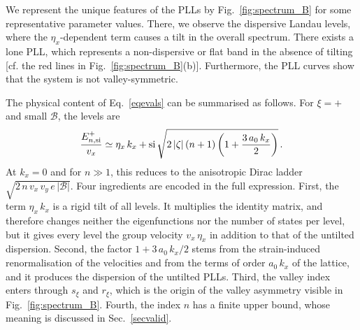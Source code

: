 \documentclass[aps,prb, onecolumn, nofootinbib, citeautoscript,10pt]{revtex4-2}
\begin{document}
We represent the unique features of the PLLs by Fig.~\ref{fig:spectrum_B} for some representative parameter values. There, we observe the dispersive Landau levels, where the $\eta_x$-dependent term causes a tilt in the overall spectrum. There exists a lone PLL, which represents a non-dispersive or flat band in the absence of tilting [cf. the red lines in Fig.~\ref{fig:spectrum_B}(b)]. Furthermore, the PLL curves show that the system is not valley-symmetric.


The physical content of Eq.~\eqref{eqevals} can be summarised as follows. For $\xi=+$ and small $\mathcal B$, the levels are
\begin{align}
\frac{E^{+}_{n,\rm si}}{v_x}\simeq\eta_x\,k_x+{\rm si}\,\sqrt{2\,|\zeta|\,(n+1)\left(1+\frac{3\,a_0\,k_x}{2}\right)}\,.
\end{align}
At $k_x=0$ and for $n\gg1$, this reduces to the anisotropic Dirac ladder $\sqrt{2\,n\,v_x\,v_y\,e\,|\mathcal B|}$. Four ingredients are encoded in the full expression. First, the term $\eta_x\,k_x$ is a rigid tilt of all levels. It multiplies the identity matrix, and therefore changes neither the eigenfunctions nor the number of states per level, but it gives every level the group velocity $v_x\,\eta_x$ in addition to that of the untilted dispersion. Second, the factor $1+3\,a_0\,k_x/2$ stems from the strain-induced renormalisation of the velocities and from the terms of order $a_0\,k_x$ of the lattice, and it produces the dispersion of the untilted PLLs. Third, the valley index enters through $s_\xi$ and $r_\xi$, which is the origin of the valley asymmetry visible in Fig.~\ref{fig:spectrum_B}. Fourth, the index $n$ has a finite upper bound, whose meaning is discussed in Sec.~\ref{secvalid}.
\end{document}
